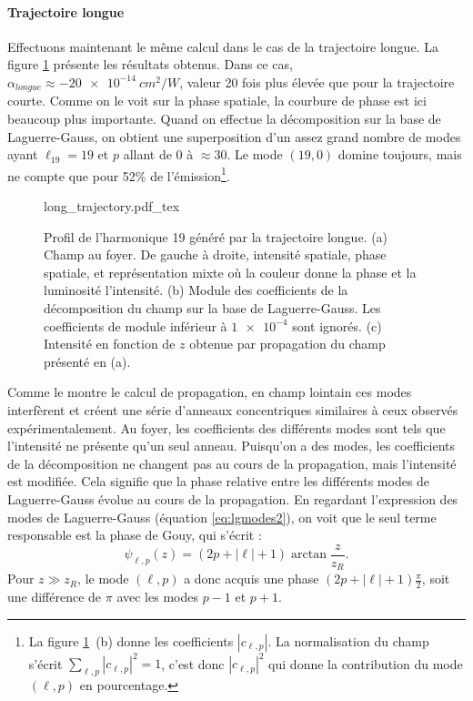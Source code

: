 \paragraph*{Trajectoire longue} Effectuons maintenant le même calcul dans le cas de la trajectoire longue. La figure \ref{Fig:DecompLong} présente les résultats obtenus. Dans ce cas, $\alpha_{longue}\approx\SI{-20e-14}{cm^2/W}$, valeur 20 fois plus élevée que pour la trajectoire courte. Comme on le voit sur la phase spatiale, la courbure de phase est ici beaucoup plus importante. Quand on effectue la décomposition sur la base de Laguerre-Gauss, on obtient une superposition d'un assez grand nombre de modes ayant $\ell_{19}=19$ et $p$ allant de 0 à $\approx 30$. Le mode $(19,0)$ domine toujours, mais ne compte que pour 52\% de l'émission\footnote{La figure \ref{Fig:DecompLong}~(b) donne les coefficients $\left|c_{\ell,p}\right|$. La normalisation du champ s'écrit $\sum_{\ell,p}{\left|c_{\ell,p}\right|^2} = 1$, c'est donc $\left|c_{\ell,p}\right|^2$ qui donne la contribution du mode $(\ell,p)$ en pourcentage.}. 

\begin{figure}[!ht]
\centering
\def\svgwidth{\columnwidth}
{long_trajectory.pdf_tex}
\caption{Profil de l'harmonique 19 généré par la trajectoire longue. (a) Champ au foyer. De gauche à droite, intensité spatiale, phase spatiale, et représentation mixte où la couleur donne la phase et la luminosité l'intensité. (b) Module des coefficients de la décomposition du champ sur la base de Laguerre-Gauss. Les coefficients de module inférieur à $\num{1e-4}$ sont ignorés. (c) Intensité en fonction de $z$ obtenue par propagation du champ présenté en (a).}
\label{Fig:DecompLong}
\end{figure}

Comme le montre le calcul de propagation, en champ lointain ces modes interfèrent et créent une série d'anneaux concentriques similaires à ceux observés expérimentalement. Au foyer, les coefficients des différents modes sont tels que l'intensité ne présente qu'un seul anneau. Puisqu'on a des modes, les coefficients de la décomposition ne changent pas au cours de la propagation, mais l'intensité est modifiée. Cela signifie que la phase relative entre les différents modes de Laguerre-Gauss évolue au cours de la propagation. En regardant l'expression des modes de Laguerre-Gauss (équation \ref{eq:lgmodes2}), on voit que le seul terme responsable est la phase de Gouy, qui s'écrit :
\begin{equation*}
\psi _{\ell ,p}(z)=(2p+\left|\ell\right|+1)\arctan{\frac{z}{z_R}}.
\end{equation*}
Pour $z\gg z_R$, le mode $(\ell,p)$ a donc acquis une phase $(2p+\left|\ell\right|+1)\frac{\pi}{2}$, soit une différence de $\pi$ avec les modes $p-1$ et $p+1$. 

